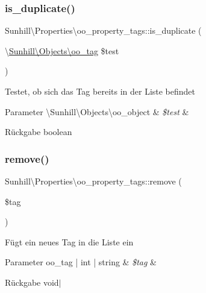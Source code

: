 \subsubsection{\texorpdfstring{is\+\_\+duplicate()}{is\_duplicate()}}
{\footnotesize\ttfamily Sunhill\textbackslash{}\+Properties\textbackslash{}oo\+\_\+property\+\_\+tags\+::is\+\_\+duplicate (\begin{DoxyParamCaption}\item[{\textbackslash{}\hyperlink{classSunhill_1_1Objects_1_1oo__tag}{Sunhill\textbackslash{}\+Objects\textbackslash{}oo\+\_\+tag}}]{\$test }\end{DoxyParamCaption})\hspace{0.3cm}{\ttfamily [protected]}}

Testet, ob sich das Tag bereits in der Liste befindet 
\begin{DoxyParams}[1]{Parameter}
\textbackslash{}\+Sunhill\textbackslash{}\+Objects\textbackslash{}oo\+\_\+object & {\em \$test} & \\
\hline
\end{DoxyParams}
\begin{DoxyReturn}{Rückgabe}
boolean 
\end{DoxyReturn}
\mbox{\label{classSunhill_1_1Properties_1_1oo__property__tags_a98d873cb30682e4b98f83f3f53792fcb}} 
\subsubsection{\texorpdfstring{remove()}{remove()}}
{\footnotesize\ttfamily Sunhill\textbackslash{}\+Properties\textbackslash{}oo\+\_\+property\+\_\+tags\+::remove (\begin{DoxyParamCaption}\item[{}]{\$tag }\end{DoxyParamCaption})}

Fügt ein neues Tag in die Liste ein 
\begin{DoxyParams}[1]{Parameter}
oo\+\_\+tag | int | string & {\em \$tag} & \\
\hline
\end{DoxyParams}
\begin{DoxyReturn}{Rückgabe}
void$\vert$ 
\end{DoxyReturn}
\mbox{\label{classSunhill_1_1Properties_1_1oo__property__tags_a101b55f83587b8882b05119c88fe1131}} 
